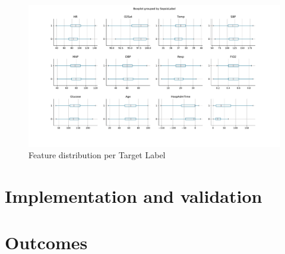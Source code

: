 \documentclass[10pt,letterpaper]{article}
\begin{document}
\begin{figure}
    \centering
    \includegraphics[scale = 0.45]{box_per_var.pdf}
    \caption{Feature distribution per Target Label}
    \label{fig:init_anal}
\end{figure}


\section*{Implementation and validation}



\section*{Outcomes}

\end{document}
